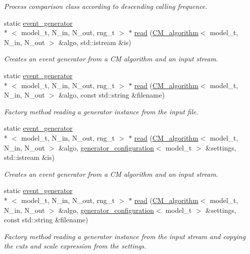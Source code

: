 \begin{DoxyCompactItemize}
\begin{DoxyCompactList}\small\item\em Process comparison class according to descending calling frequence. \end{DoxyCompactList}\item 
static \hyperlink{a00210}{event\-\_\-generator}\\*
$<$ model\-\_\-t, N\-\_\-in, N\-\_\-out, rng\-\_\-t $>$ $\ast$ \hyperlink{a00210_a4e2547b152143557d6e3ddfe8498c25a}{read} (\hyperlink{a00070}{C\-M\-\_\-algorithm}$<$ model\-\_\-t, N\-\_\-in, N\-\_\-out $>$ \&algo, std\-::istream \&is)
\begin{DoxyCompactList}\small\item\em Creates an event generator from a C\-M algorithm and an input stream. \end{DoxyCompactList}\item 
static \hyperlink{a00210}{event\-\_\-generator}\\*
$<$ model\-\_\-t, N\-\_\-in, N\-\_\-out, rng\-\_\-t $>$ $\ast$ \hyperlink{a00210_a76369b8dc8b2e460bdc8f23629d7c7cd}{read} (\hyperlink{a00070}{C\-M\-\_\-algorithm}$<$ model\-\_\-t, N\-\_\-in, N\-\_\-out $>$ \&algo, const std\-::string \&filename)
\begin{DoxyCompactList}\small\item\em Factory method reading a generator instance from the input file. \end{DoxyCompactList}\item 
static \hyperlink{a00210}{event\-\_\-generator}\\*
$<$ model\-\_\-t, N\-\_\-in, N\-\_\-out, rng\-\_\-t $>$ $\ast$ \hyperlink{a00210_afe0cba2cbd6a6c588fbb587f8bf12cb0}{read} (\hyperlink{a00070}{C\-M\-\_\-algorithm}$<$ model\-\_\-t, N\-\_\-in, N\-\_\-out $>$ \&algo, \hyperlink{a00237}{generator\-\_\-configuration}$<$ model\-\_\-t $>$ \&settings, std\-::istream \&is)
\begin{DoxyCompactList}\small\item\em Creates an event generator from a C\-M algorithm and an input stream. \end{DoxyCompactList}\item 
static \hyperlink{a00210}{event\-\_\-generator}\\*
$<$ model\-\_\-t, N\-\_\-in, N\-\_\-out, rng\-\_\-t $>$ $\ast$ \hyperlink{a00210_a9e740d3c15e54bab2a9e3506e2a99ffe}{read} (\hyperlink{a00070}{C\-M\-\_\-algorithm}$<$ model\-\_\-t, N\-\_\-in, N\-\_\-out $>$ \&algo, \hyperlink{a00237}{generator\-\_\-configuration}$<$ model\-\_\-t $>$ \&settings, const std\-::string \&filename)
\begin{DoxyCompactList}\small\item\em Factory method reading a generator instance from the input stream and copying the cuts and scale expression from the settings. \end{DoxyCompactList}\end{DoxyCompactItemize}
